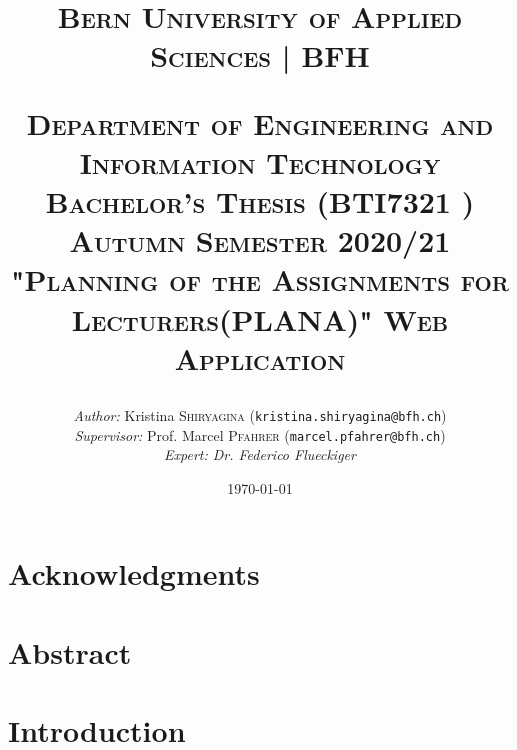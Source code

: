 \documentclass{scrartcl}
\begin{document}
\begin{titlepage}


\title{\textsc{\LARGE Bern University of Applied Sciences | BFH }\\[1cm]
\begin{center}
\end{center}
\textsc{\small Department of Engineering and Information Technology}\\
\textsc{\small Bachelor's Thesis (BTI7321 ) Autumn Semester 2020/21}\\[1cm]
\textsc{"Planning of the Assignments for Lecturers(PLANA)" Web Application}}
\date{\today}   %
\author{\textit{Author: }Kristina \textsc{Shiryagina} (\texttt{kristina.shiryagina@bfh.ch}) \\
 \textit{Supervisor: } Prof. Marcel \textsc{Pfahrer}  (\texttt{marcel.pfahrer@bfh.ch})\\
 \textit{Expert: Dr. Federico Flueckiger}  \textsc{} \\
 }
\maketitle	

\newpage


	
\tableofcontents
\clearpage
\end{titlepage}

\setcounter{secnumdepth}{-2}%





\section{Acknowledgments}


\section{Abstract}


\setcounter{secnumdepth}{2}  %



\section{Introduction}
\end{document}
